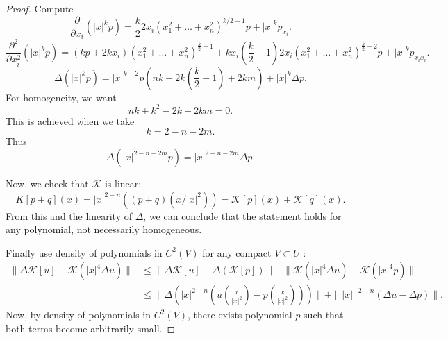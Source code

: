 \begin{proof}
	Compute
	\[
		\frac{\partial }{\partial x_i} \left( |x|^k p \right) 
		= \frac{k}{2} 2 x_i \left( x_1^2 + \ldots + x_n^2 \right) ^{k / 2 - 1} p + |x|^k p_{x_i}
	.\] 
	\[
		\frac{\partial ^2}{\partial x_i^2} \left( |x|^k p \right) =
		(k p + 2 k x_i) (x_1^2 + \ldots + x_n^2)^{\frac{k}{2} - 1} + k x_i (\frac{k}{2} - 1) 2 x_i \left( x_1^2 + \ldots + x_n^2 \right) ^{\frac{k}{2} - 2} p + |x|^k p_{x_i x_i}
	.\] 
	\[
		\Delta\left( |x|^k p \right) = |x|^{k - 2} p \left( n k + 2 k \left( \frac{k}{2} - 1 \right) + 2 k m \right) + |x|^k \Delta p
	.\] 
	For homogeneity, we want
	\[
		nk + k^2 - 2 k + 2 k m = 0
	.\] 
	This is achieved when we take
	\[
		k = 2 - n - 2m
	.\] 
	Thus
	\[
		\Delta\left( |x|^{2 - n - 2m} p \right)  = |x|^{2 - n - 2m} \Delta p
	.\] 

	Now, we check that $\mathcal{K}$ is linear:
	\[
		K[p + q](x) = |x|^{2 - n} \left( (p + q)\left( x / |x|^2 \right)  \right) 
		= \mathcal{K}[p](x)+ \mathcal{K}[q](x)
	.\] 
	From this and the linearity of $\Delta$, we can conclude that the statement holds for any polynomial, not necessarily homogeneous.

	Finally use density of polynomials in $C^2(V)$ for any compact $V \subset U$ :
	\begin{align*}
		\|\Delta \mathcal{K}[u] - \mathcal{K}\left( |x|^4 \Delta u \right) \|
		&\leq \|\Delta \mathcal{K}[u] - \Delta \left( \mathcal{K} [p] \right)\| + 
		\|\mathcal{K}\left( |x|^4 \Delta u \right)  - \mathcal{K}\left( |x|^4 p \right) \|\\
		&\leq \|\Delta \left( |x|^{2 - n} \left(  u\left( \frac{x}{|x|^2} \right) - p\left( \frac{x}{|x|^2} \right)  \right)  \right) \|
		+ \| |x|^{-2 - n} \left( \Delta u - \Delta p \right) \|
	.\end{align*}
	Now, by density of polynomials in $C^2(V)$, there exists polynomial $p$ such that both terms become arbitrarily small. 
\end{proof}

